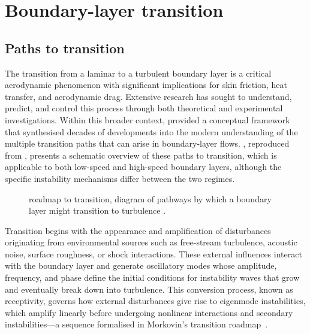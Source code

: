 \section{Boundary-layer transition}
\subsection{Paths to transition}
The transition from a laminar to a turbulent boundary layer is a critical aerodynamic phenomenon with significant implications for skin friction, heat transfer, and aerodynamic drag. Extensive research has sought to understand, predict, and control this process through both theoretical and experimental investigations. Within this broader context, \citet{Morkovin1994} provided a conceptual framework that synthesised decades of developments into the modern understanding of the multiple transition paths that can arise in boundary-layer flows. , reproduced from \citet{Fedorov2011}, presents a schematic overview of these paths to transition, which is applicable to both low-speed and high-speed boundary layers, although the specific instability mechanisms differ between the two regimes.

\begin{figure}[hbt!]
    \centering
    \fontsize{9}{10}\selectfont
    \caption{\cite{Morkovin1994} roadmap to transition, diagram of pathways by which a boundary layer might transition to turbulence \citep{Fedorov2011}.}
    \label{figure:transitionmarkovin}
\end{figure}

Transition begins with the appearance and amplification of disturbances originating from environmental sources such as free-stream turbulence, acoustic noise, surface roughness, or shock interactions. These external influences interact with the boundary layer and generate oscillatory modes whose amplitude, frequency, and phase define the initial conditions for instability waves that grow and eventually break down into turbulence. This conversion process, known as receptivity, governs how external disturbances give rise to eigenmode instabilities, which amplify linearly before undergoing nonlinear interactions and secondary instabilities---a sequence formalised in Morkovin's transition roadmap~\citep{Morkovin1994}.

